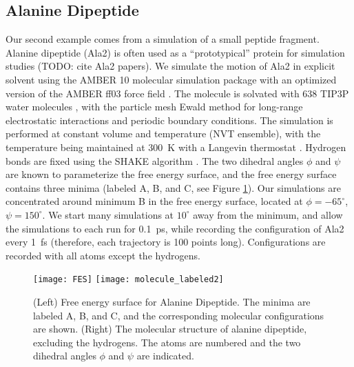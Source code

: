 \documentclass[aip,jcp,reprint,twocolumn]{revtex4-1}
\begin{document}
\subsection{Alanine Dipeptide}

Our second example comes from a simulation of a small peptide fragment.
%
Alanine dipeptide (Ala2) is often used as a ``prototypical'' protein for simulation studies (TODO: cite Ala2 papers).
%
We simulate the motion of Ala2 in explicit solvent using the AMBER 10 molecular simulation package \cite{case2008Amber} with an
optimized version \cite{best2009optimized} of the AMBER ff03 force field \cite{duan2003point}.
%
The molecule is solvated with 638 TIP3P water molecules \cite{jorgensen1983comparison}, with the particle mesh Ewald method for long-range electrostatic interactions \cite{essmann1995smooth} and periodic boundary conditions.
%
The simulation is performed at constant volume and temperature (NVT ensemble), with the temperature being maintained at 300~K with a Langevin thermostat \cite{loncharich1992langevin}.
%
Hydrogen bonds are fixed using the SHAKE algorithm \cite{ryckaert1977numerical}.
%
The two dihedral angles $\phi$ and $\psi$ are known to parameterize the free energy surface, and the free energy surface contains three minima (labeled A, B, and C, see Figure \ref{fig:ala_fes}).
%
Our simulations are concentrated around minimum B in the free energy surface, located at $\phi=-65^{\circ}$, $\psi=150^{\circ}$.
%
We start many simulations at $10^{\circ}$ away from the minimum, and allow the simulations to each run for 0.1~ps, while recording the configuration of Ala2 every 1~fs (therefore, each trajectory is 100 points long).
%
Configurations are recorded with all atoms except the hydrogens.

\begin{figure}[ht]
    \texttt{[image: FES]}
    \texttt{[image: molecule\_labeled2]}
    \caption{(Left) Free energy surface for Alanine Dipeptide. The minima are labeled A, B, and C, and the corresponding molecular configurations are shown. (Right) The molecular structure of alanine dipeptide, excluding the hydrogens. The atoms are numbered and the two dihedral angles $\phi$ and $\psi$ are indicated.}
    \label{fig:ala_fes}
\end{figure}
\end{document}
